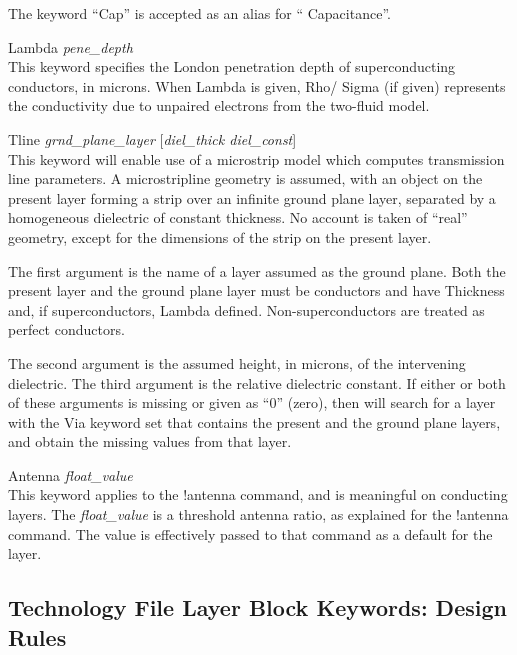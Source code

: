 \begin{description}
The keyword ``{\et Cap}'' is accepted as an alias for ``{\et
Capacitance}''.

\item{\et Lambda {\it pene\_depth}}\\
This keyword specifies the London penetration depth of superconducting
conductors, in microns.  When {\et Lambda} is given, {\et Rho}/{\et
Sigma} (if given) represents the conductivity due to unpaired
electrons from the two-fluid model.

\item{\et Tline {\it grnd\_plane\_layer} [{\it diel\_thick diel\_const\/}]}\\
This keyword will enable use of a microstrip model which computes
transmission line parameters.  A microstripline geometry is assumed,
with an object on the present layer forming a strip over an infinite
ground plane layer, separated by a homogeneous dielectric of constant
thickness.  No account is taken of ``real'' geometry, except for the
dimensions of the strip on the present layer.

The first argument is the name of a layer assumed as the ground plane. 
Both the present layer and the ground plane layer must be conductors
and have {\et Thickness} and, if superconductors, {\et Lambda}
defined.  Non-superconductors are treated as perfect conductors.

The second argument is the assumed height, in microns, of the
intervening dielectric.  The third argument is the relative dielectric
constant.  If either or both of these arguments is missing or given as
``0'' (zero), then {\Xic} will search for a layer with the {\et Via}
keyword set that contains the present and the ground plane layers, and
obtain the missing values from that layer.

\item{\et Antenna} {\it float\_value}\\
This keyword applies to the {\cb !antenna} command, and is meaningful
on conducting layers.  The {\it float\_value} is a threshold
antenna ratio, as explained for the {\cb !antenna} command.  The value
is effectively passed to that command as a default for the layer.
\end{description}


\subsection{Technology File Layer Block Keywords:  Design Rules}

